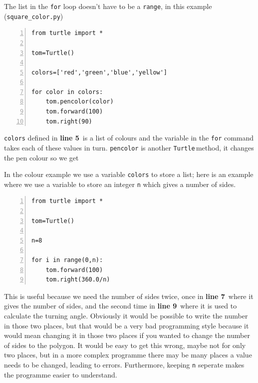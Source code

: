 \documentclass[11pt,a4paper]{scrartcl}
\newcommand{\turtle}{\texttt{Turtle}\,}
\newcommand{\lnn}[1]{\textbf{line #1}\,}
\begin{document}
The list in the \texttt{for} loop doesn't have to be a \texttt{range},
in this example (\texttt{square\_color.py})
\begin{lstlisting}[numbers=left]
from turtle import *

tom=Turtle()

colors=['red','green','blue','yellow']

for color in colors:
    tom.pencolor(color)
    tom.forward(100)
    tom.right(90)
\end{lstlisting}
\texttt{colors} defined in \lnn{5} is a list of colours and the
variable in the \texttt{for} command takes each of these values in
turn. \texttt{pencolor} is another \turtle method, it changes the pen
colour so we get
\begin{center}
\end{center}

In the colour example we use a variable \texttt{colors} to store a
list; here is an example where we use a variable to store an integer \texttt{n} which gives a number of sides.
\begin{lstlisting}[numbers=left]
from turtle import *

tom=Turtle()

n=8

for i in range(0,n):
    tom.forward(100)
    tom.right(360.0/n)

\end{lstlisting}
This is useful because we need the number of sides twice, once in
\lnn{7} where it gives the number of sides, and the second time in
\lnn{9} where it is used to calculate the turning angle. Obviously it
would be possible to write the number in those two places, but that
would be a very bad programming style because it would mean changing
it in those two places if you wanted to change the number of sides to
the polygon. It would be easy to get this wrong, maybe not for only
two places, but in a more complex programme there may be many places a
value needs to be changed, leading to errors. Furthermore, keeping
\texttt{n} seperate makes the programme easier to understand.
\end{document}
